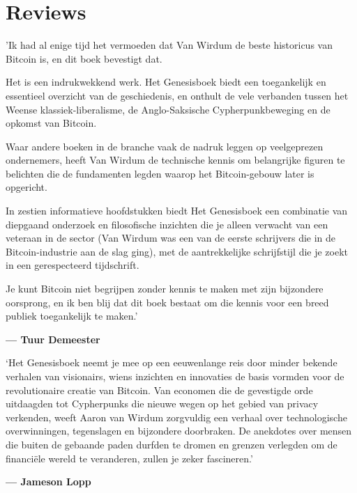 \documentclass[
  a5paper,
  smalldemyvopaper,11pt,twoside,onecolumn,openright,extrafontsizes,
hidelinks]{memoir}
\renewenvironment{quote}%
               {\list{}{\rightmargin=.3cm\leftmargin=.3cm}%
                \itshape \item[]}%
               {\endlist}
\begin{document}

\chapter*{Reviews}\label{reviews}


\begin{quote}
'Ik had al enige tijd het vermoeden dat Van Wirdum de beste historicus
van Bitcoin is, en dit boek bevestigt dat.

Het is een indrukwekkend werk. Het Genesisboek biedt een toegankelijk en
essentieel overzicht van de geschiedenis, en onthult de vele verbanden
tussen het Weense klassiek-liberalisme, de Anglo-Saksische
Cypherpunkbeweging en de opkomst van Bitcoin.

Waar andere boeken in de branche vaak de nadruk leggen op veelgeprezen
ondernemers, heeft Van Wirdum de technische kennis om belangrijke
figuren te belichten die de fundamenten legden waarop het Bitcoin-gebouw
later is opgericht.

In zestien informatieve hoofdstukken biedt Het Genesisboek een
combinatie van diepgaand onderzoek en filosofische inzichten die je
alleen verwacht van een veteraan in de sector (Van Wirdum was een van de
eerste schrijvers die in de Bitcoin-industrie aan de slag ging), met de
aantrekkelijke schrijfstijl die je zoekt in een gerespecteerd
tijdschrift.

Je kunt Bitcoin niet begrijpen zonder kennis te maken met zijn
bijzondere oorsprong, en ik ben blij dat dit boek bestaat om die kennis
voor een breed publiek toegankelijk te maken.'

\textbf{--- Tuur Demeester}
\end{quote}

\newpage

\begin{quote}
`Het Genesisboek neemt je mee op een eeuwenlange reis door minder
bekende verhalen van visionairs, wiens inzichten en innovaties de basis
vormden voor de revolutionaire creatie van Bitcoin. Van economen die de
gevestigde orde uitdaagden tot Cypherpunks die nieuwe wegen op het
gebied van privacy verkenden, weeft Aaron van Wirdum zorgvuldig een
verhaal over technologische overwinningen, tegenslagen en bijzondere
doorbraken. De anekdotes over mensen die buiten de gebaande paden
durfden te dromen en grenzen verlegden om de financiële wereld te
veranderen, zullen je zeker fascineren.'

\textbf{--- Jameson Lopp}
\end{quote}
\end{document}
